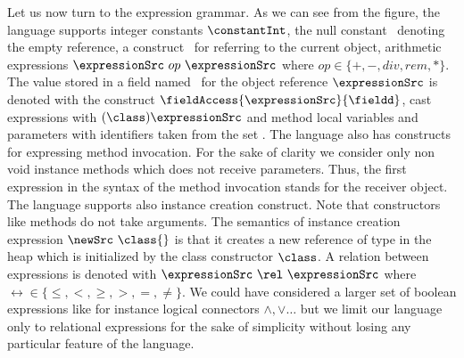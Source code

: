 %

Let us now turn to the expression grammar. As we can see from the figure, the language supports 
    integer constants $\constantInt$, the null constant \Mynull \ 
    denoting  the empty reference, a construct \this \ for referring to the current object,  
    arithmetic expressions  $\expressionSrc \ op \ \expressionSrc$ where $op \in  \{+ , - , div , rem, * \}$.
    The value stored in a field named \fieldd \ for the object reference $\expressionSrc $ is denoted with
    the construct  $ \fieldAccess{\expressionSrc}{\fieldd} $, cast expressions with   $(\class) \expressionSrc$
    and method local variables  and parameters with identifiers taken from the set  \var.  
    The language also has constructs for expressing method invocation.  For the sake of clarity we consider only non void  instance  methods which does not 
    receive parameters.
    Thus, the first expression in the syntax of the method invocation stands for the receiver object.  
    The language supports also instance creation construct. Note that constructors like methods do not take arguments.
    The semantics of instance creation expression $\newSrc \ \class{}$  is that it 
    creates a new reference of type \class{} in the heap  which is initialized by the class constructor $\class$.
    A relation between    expressions is denoted with
    $\expressionSrc \ \rel \ \expressionSrc $ where $\rel  \in \{ \le, < ,  \ge, >, = , \neq \}$.  
    We could have considered a larger set of boolean expressions like for instance logical connectors $\wedge, \vee \ldots$
     but we limit our language only to  relational expressions for the sake of simplicity without losing any particular feature of the language.
